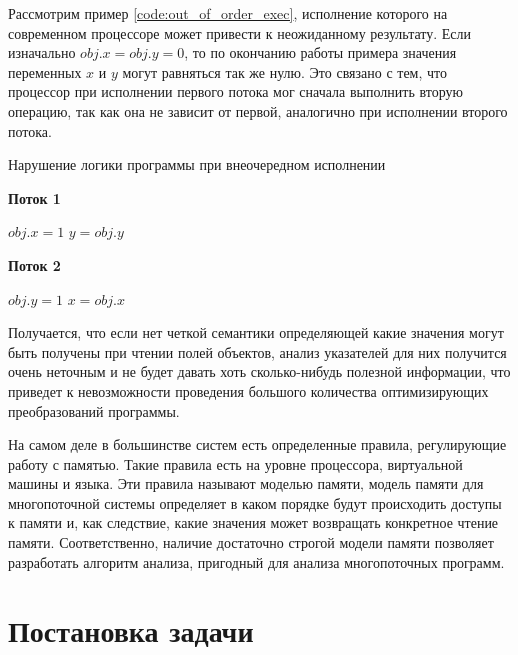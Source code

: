 \documentclass[14pt,titlepage]{extarticle}
\newcommand{\algorithmictitle}[1]{\hspace{8mm}\textbf{#1}}
\let\oldsection\section
\renewcommand{\section}{\newpage\oldsection}
\begin{document}
      Рассмотрим пример \ref{code:out_of_order_exec}, исполнение которого на
      современном процессоре может привести к неожиданному результату.
      Если изначально $obj.x = obj.y = 0$, то по окончанию работы примера
      значения переменных $x$ и $y$ могут равняться так же нулю. Это связано с
      тем, что процессор при исполнении первого потока мог сначала выполнить
      вторую операцию, так как она не зависит от первой, аналогично при
      исполнении второго потока.

      \begin{algorithm}
        \caption{Нарушение логики программы при внеочередном исполнении}
        \label{code:out_of_order_exec}
        \begin{multicols*}{2}
          \algorithmictitle{Поток 1}
          \begin{algorithmic}[1]
            \STATE $obj.x = 1$
            \STATE $y = obj.y$
          \end{algorithmic}
          \columnbreak
          \algorithmictitle{Поток 2}
          \begin{algorithmic}[1]
            \STATE $obj.y = 1$
            \STATE $x = obj.x$
          \end{algorithmic}
        \end{multicols*}
      \end{algorithm}

      Получается, что если нет четкой семантики определяющей какие значения
      могут быть получены при чтении полей объектов, анализ указателей для
      них получится очень неточным и не будет давать хоть сколько-нибудь
      полезной информации, что приведет к невозможности проведения большого
      количества оптимизирующих преобразований программы.

      На самом деле в большинстве систем есть определенные правила,
      регулирующие работу с памятью. Такие правила есть на уровне процессора,
      виртуальной машины и языка. Эти правила называют моделью памяти,
      модель памяти для многопоточной системы определяет в каком
      порядке будут происходить доступы к памяти и, как следствие, какие
      значения может возвращать конкретное чтение памяти. Соответственно,
      наличие достаточно строгой модели памяти позволяет разработать алгоритм
      анализа, пригодный для анализа многопоточных программ.


  \section{Постановка задачи}
\end{document}
